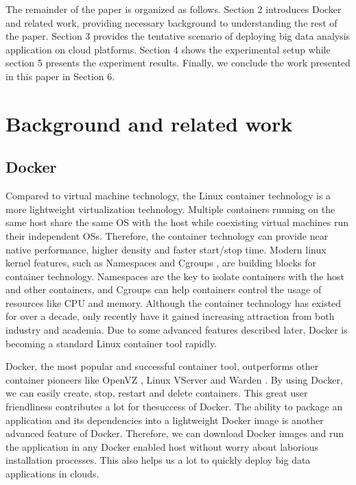 \documentclass{ieicej}
\begin{document}
The remainder of the paper is organized as follows. Section 2 introduces Docker and related work, providing necessary background to understanding the rest of the paper. Section 3 provides the tentative scenario of deploying big data analysis application on cloud platforms. Section 4 shows the experimental setup while section 5 presents the experiment results. Finally, we conclude the work presented in this paper in Section 6.

\section{Background and related work}
\subsection{Docker}
Compared to virtual machine technology, the Linux container technology is a more lightweight virtualization technology. Multiple containers running on the same host share the same OS with the host while coexisting virtual machines run their independent OSs. Therefore, the container technology can provide near native performance, higher density and faster start/stop time. Modern linux kernel features, such as Namespaces \cite{michael2013namespaces} and Cgroups \cite{paul2015cgroups}, are building blocks for container technology. Namespaces are the key to isolate containers with the host and other containers, and Cgroups can help containers control the usage of resources like CPU and memory. Although the container technology has existed for over a decade, only recently have it gained increasing attraction from both industry and academia. Due to some advanced features described later, Docker is becoming a standard Linux container tool rapidly.

Docker, the most popular and successful container tool, outperforms other container pioneers like OpenVZ \cite{openvz2015}, Linux VServer \cite{vserver2015} and Warden \cite{warden2015}. By using Docker, we can easily create, stop, restart and delete containers. This great user friendliness contributes a lot for thesuccess of Docker. The ability to package an application and its dependencies into a lightweight Docker image is another advanced feature of Docker. Therefore, we can download Docker images and run the application in any Docker enabled host without worry about laborious installation processes. This also helps us a lot to quickly deploy big data applications in clouds.
\end{document}

